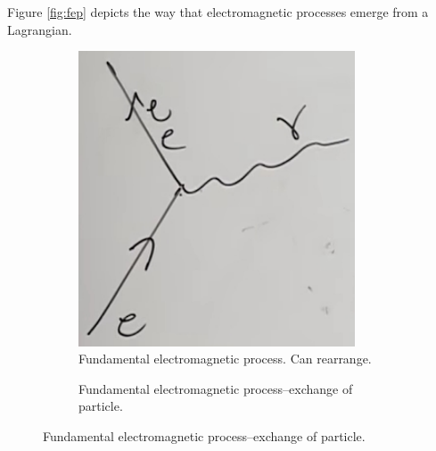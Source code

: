 \documentclass[]{article}
\begin{document}
Figure \ref{fig:fep} depicts the way that electromagnetic processes emerge from a Lagrangian.

\begin{figure}[H]
	\caption{Electromagnetic processes emerge from a Lagrangian: $\mathcal{L}$: $e \Psi_e^\dagger \Psi_e A$}\label{fig:fep}
	\begin{subfigure}[t]{0.45\textwidth}
		\caption{Fundamental electromagnetic process. Can rearrange.}\label{fig:fep1}
		\includegraphics[width=0.9\textwidth]{2-1-em-process}
	\end{subfigure}
	\begin{subfigure}[t]{0.45\textwidth}
		\caption{Fundamental electromagnetic process--exchange of particle.}\label{fig:fep2}

\end{subfigure}
\end{figure}
\end{document}
